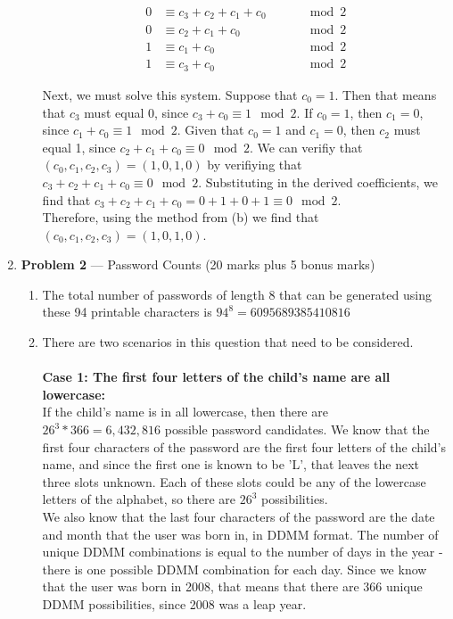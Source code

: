 \documentclass[11pt]{article}
\theoremstyle{definition}
\begin{document}
\begin{enumerate}
\begin{enumerate}
\begin{align*}
0 &\equiv c_3 + c_2 + c_1 + c_0 \qquad &\mod{2}\\
0 &\equiv c_2 + c_1 + c_0 \qquad &\mod{2}\\
1 &\equiv c_1 + c_0 \qquad &\mod{2}\\
1 &\equiv c_3 + c_0 \qquad &\mod{2}
\end{align*}

Next, we must solve this system. Suppose that $c_0 = 1$. Then that means that $c_3$ must equal 0, since $c_3 + c_0 \equiv 1 \mod{2}$. If $c_0 = 1$, then $c_1 = 0$, since $c_1 + c_0 \equiv 1 \mod{2}$. Given that $c_0 = 1$ and $c_1 = 0$, then $c_2$ must equal 1,
since $c_2 + c_1 + c_0 \equiv 0 \mod{2}$. We can verifiy that $(c_0, c_1, c_2, c_3) = (1, 0, 1, 0)$ by verifiying that $c_3 + c_2 + c_1 + c_0 \equiv 0 \mod{2}$. Substituting in the derived coefficients, we find that $c_3 + c_2 + c_1 + c_0 = 0 + 1 + 0 + 1 \equiv 0 \mod{2}$.\\

Therefore, using the method from (b) we find that $(c_0, c_1, c_2, c_3) = (1, 0, 1, 0)$.

\end{enumerate}

\newpage

\item[] \textbf{Problem 2} --- Password Counts (20 marks plus 5 bonus marks)

\begin{enumerate}
\item The total number of passwords of length 8 that can be generated using these 94 printable characters is $94^8 = 6095689385410816$

\item There are two scenarios in this question that need to be considered.\\
\\ \textbf{Case 1: The first four letters of the child's name are all lowercase:}\\
If the child's name is in all lowercase, then there are $26^3 * 366 = 6,432,816$ possible password candidates. We know that the first
four characters of the password are the first four letters of the child's name, and since the first one is known to be 'L', that leaves
the next three slots unknown. Each of these slots could be any of the lowercase letters of the alphabet, so there are $26^3$
possibilities.\\

We also know that the last four characters of the password are the date and month that the user was born in, in DDMM format. The number
of unique DDMM combinations is equal to the number of days in the year - there is one possible DDMM combination for each day. Since we know
that the user was born in 2008, that means that there are 366 unique DDMM possibilities, since 2008 was a leap year.\\


\end{enumerate}
\end{enumerate}
\end{document}
